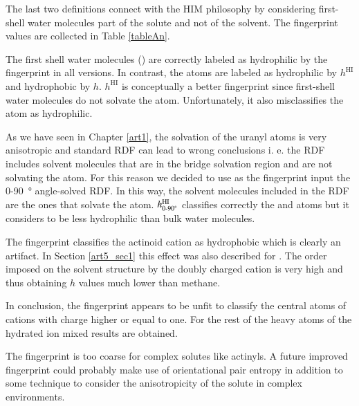 The last two definitions connect with the HIM philosophy by considering first-shell water 
molecules part of the solute and not of the solvent. The fingerprint values are 
collected in Table 
\ref{tableAn}.

The first shell water molecules (\ofs) are correctly labeled as hydrophilic by the fingerprint in 
all 
versions. In contrast, the \oyl atoms are labeled as hydrophilic by $h^\text{HI}$ and 
hydrophobic by $h$. $h^\text{HI}$ is conceptually a better fingerprint since first-shell water 
molecules do not solvate the \oyl atom. Unfortunately, it also misclassifies the \oyl 
atom as hydrophilic.

As we have seen in Chapter \ref{art1}, the solvation of the uranyl atoms is 
very 
anisotropic and standard RDF  can lead to wrong conclusions 
i. e. the \oyl RDF 
includes solvent 
molecules that are in the bridge solvation region and are not solvating the \oyl atom. For 
this reason we decided to use as the fingerprint 
input the 0-\SI{90}{\degree} angle-solved RDF. In this way, the solvent molecules included in the 
RDF are the ones that solvate the atom. $h^\text{HI}_\text{0-\SI{90}{\degree}}$ classifies 
correctly 
the \oyl and \ofs atoms but it considers \ofs to be less hydrophilic than 
bulk water molecules.

The fingerprint classifies the actinoid cation as hydrophobic which is clear\-ly an artifact. 
In 
Section \ref{art5_sec1} this effect was also described for . The order imposed on the 
solvent structure by the 
doubly charged cation is very high and thus obtaining $h$ values much lower than methane. 

In conclusion, the fingerprint appears to be unfit to classify the central atoms of cations 
with charge higher or equal to one. For the rest of the heavy atoms of the hydrated ion mixed 
results are obtained.

The fingerprint is too coarse for complex solutes like actinyls. A future improved 
fingerprint could probably make use of orientational pair entropy in addition to some technique to 
consider the anisotropicity of the solute in complex environments. 
